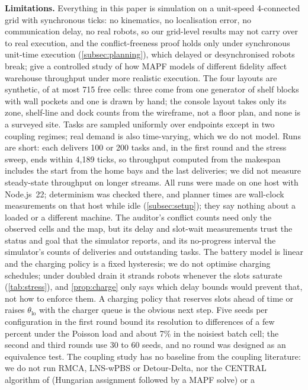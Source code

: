 \noindent\textbf{Limitations.}
Everything in this paper is simulation on a unit-speed 4-connected grid with
synchronous ticks: no kinematics, no localisation error, no communication
delay, no real robots, so our grid-level results may not carry over to real
execution, and the conflict-freeness proof holds only under synchronous
unit-time execution (\cref{subsec:planning}), which delayed or desynchronised
robots break; \citet{varambally2022which} give a controlled study of how MAPF
models of different fidelity affect warehouse throughput under more realistic
execution. The four layouts are synthetic, of at most 715 free cells: three
come from one generator of shelf blocks with wall pockets and one is drawn
by hand; the console layout takes only its zone, shelf-line and dock counts
from the wireframe, not a floor plan, and none is a surveyed site. Tasks are
sampled uniformly over endpoints except in
two coupling regimes; real demand is also time-varying, which we do not
model. Runs are short: each delivers 100 or 200 tasks and, in the first round
and the stress sweep, ends within 4{,}189 ticks, so throughput computed from
the makespan includes the start from the home bays and the last deliveries;
we did not measure steady-state throughput on longer streams. All runs were
made on one host with Node.js~22; determinism was checked there, and
planner times are wall-clock measurements on that host while idle
(\cref{subsec:setup}); they say nothing about a loaded or a different machine. The auditor's conflict counts need only the observed
cells and the map, but its delay and slot-wait measurements trust the status and goal
that the simulator reports, and its no-progress interval the simulator's
counts of deliveries and outstanding tasks. The battery model is linear and the
charging policy is a fixed hysteresis; we do not optimise charging
schedules; under doubled drain it strands robots whenever the slots
saturate (\cref{tab:stress}), and \cref{prop:charge} only says which delay
bounds would prevent that, not how to enforce them. A charging policy that
reserves slots ahead of time or raises $\theta_{\mathrm{lo}}$ with the
charger queue is the obvious next step. Five seeds per configuration in the
first round bound its resolution to differences of a few percent under the Poisson load
and about 7\% in the noisiest batch cell; the second
and third rounds use 30 to 60 seeds, and no round was designed as an equivalence
test. The coupling study has no baseline from the coupling literature: we do
not run RMCA, LNS-wPBS or Detour-Delta, nor the CENTRAL algorithm of
\citet{ma2017lifelong} (Hungarian assignment followed by a MAPF solve) or a
